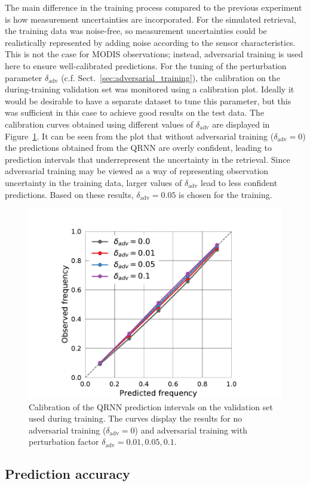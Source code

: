 \documentclass[journal abbreviation, manuscript]{copernicus}
\begin{document}
The main difference in the training process compared to the previous experiment
is how measurement uncertainties are incorporated. For the simulated retrieval,
the training data was noise-free, so measurement uncertainties could be
realistically represented by adding noise according to the sensor
characteristics. This is not the case for MODIS observations; instead,
adversarial training is used here to ensure well-calibrated predictions. For the
tuning of the perturbation parameter $\delta_{\text{adv}}$ (c.f.
Sect.~\ref{sec:adversarial_training}), the calibration on the during-training
validation set was monitored using a calibration plot. Ideally it would be
desirable to have a separate dataset to tune this parameter, but this was
sufficient in this case to achieve good results on the test data. The calibration curves
obtained using different values of $\delta_\text{adv}$ are displayed in
Figure~\ref{fig:validation_calibration}. It can be seen from the plot that
without adversarial training ($\delta_\text{adv} = 0$) the predictions obtained
from the QRNN are overly confident, leading to prediction intervals that
underrepresent the uncertainty in the retrieval. Since adversarial training may
be viewed as a way of representing observation uncertainty in the training data,
larger values of $\delta_\text{adv}$ lead to less confident predictions. Based
on these results, $\delta_\text{adv} = 0.05$ is chosen for the training.

  \begin{figure}[hbpt!]
    \centering
    \includegraphics[width = 0.4\linewidth]{../plots/validation_calibration}
    \caption{Calibration of the QRNN prediction intervals on the validation set
      used during training. The curves display the results for no adversarial training
      ($\delta_\text{adv} = 0$) and adversarial training with perturbation
      factor $\delta_\text{adv} = 0.01, 0.05, 0.1$.}
    \label{fig:validation_calibration}
  \end{figure}


\subsection{Prediction accuracy}
\end{document}
